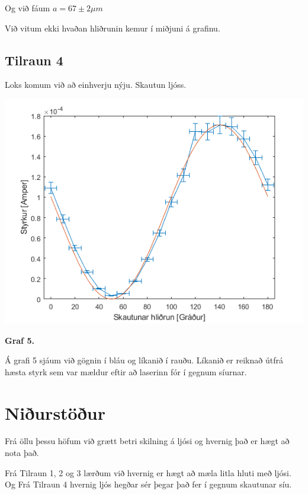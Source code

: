 \documentclass[12pt]{article}
\begin{document}
Og við fáum $a=67\pm 2 \mu m$

Við vitum ekki hvaðan hliðrunin kemur í miðjuni á grafinu.

\subsection{Tilraun 4}

Loks komum við að einhverju nýju. Skautun ljóss.

\begin{center}
    \includegraphics[scale=0.5]{html/data_05.png}
    
    \bf Graf 5.
\end{center}

Á grafi 5 sjáum við gögnin í bláu og líkanið í rauðu. Líkanið er reiknað útfrá hæsta styrk sem var mældur eftir að laserinn fór í gegnum síurnar.

\section{Niðurstöður}

Frá öllu þessu höfum við grætt betri skilning á ljósi og hvernig það er hægt að nota það. 

Frá Tilraun 1, 2 og 3 lærðum við hvernig er hægt að mæla litla hluti með ljósi. Og Frá Tilraun 4 hvernig ljós hegðar sér þegar það fer í gegnum skautunar síu.
\end{document}
